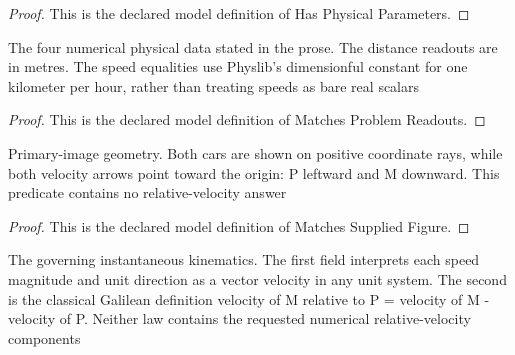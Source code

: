 \begin{proof}
  This is the declared model definition of Has Physical Parameters.
\end{proof}
\begin{definition}
  \label{def:physics:phyx-mini-0748:phyxminiproblems-problemphyxmini0748-matchesproblemreadouts}
  The four numerical physical data stated in the prose. The distance readouts are in metres. The speed equalities use Physlib's dimensionful constant for one kilometer per hour, rather than treating speeds as bare real scalars
\end{definition}
\begin{proof}
  This is the declared model definition of Matches Problem Readouts.
\end{proof}
\begin{definition}
  \label{def:physics:phyx-mini-0748:phyxminiproblems-problemphyxmini0748-matchessuppliedfigure}
  Primary-image geometry. Both cars are shown on positive coordinate rays, while both velocity arrows point toward the origin: P leftward and M downward. This predicate contains no relative-velocity answer
\end{definition}
\begin{proof}
  This is the declared model definition of Matches Supplied Figure.
\end{proof}
\begin{definition}
  \label{def:physics:phyx-mini-0748:phyxminiproblems-problemphyxmini0748-obeysclassicalrelativekinematics}
  The governing instantaneous kinematics. The first field interprets each speed magnitude and unit direction as a vector velocity in any unit system. The second is the classical Galilean definition velocity of M relative to P = velocity of M - velocity of P. Neither law contains the requested numerical relative-velocity components
\end{definition}
